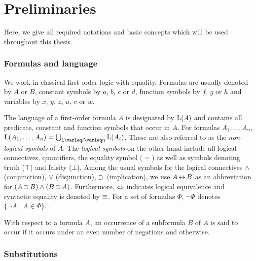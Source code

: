 \section{Preliminaries}
\label{sec:preliminaries}

Here, we give all required notations and basic concepts which will be used throughout this thesis.

\subsubsection*{Formulas and language}

We work in classical first-order logic with equality.
Formulas are usually denoted by $A$ or $B$, constant symbols by $a$, $b$, $c$ or $d$, function symbols by $f$, $g$ or $h$ and variables by $x$, $y$, $z$, $u$, $v$ or $w$.

The language of a first-order formula $A$ is designated by $\operatorname{L}(A)$ and contains all predicate, constant and function symbols that occur in $A$.
For formulas $A_1, \ldots, A_n$, $\Lang(A_1, \ldots, A_n) = \bigcup_{1\varleq i \varleq n} \Lang(A_i)$.
These are also referred to as the \emph{\mbox{non-logical} symbols} of $A$.
The \emph{logical symbols} on the other hand include all logical connectives, quantifiers, the equality symbol ($=$) as well as symbols denoting truth ($\top$) and falsity ($\bot$).
Among the usual symbols for the logical connectives $\land$ (conjunction), $\lor$ (disjunction), $\operatorname{\supset}$ (implication),
we use $A \operatorname{\leftrightarrow} B$ as an abbreviation for $(A\operatorname{\supset} B) \land (B\operatorname{\supset} A)$.
Furthermore, $\operatorname{\Leftrightarrow}$ indicates logical equivalence and syntactic equality is denoted by $\equiv$.
For a set of formulas $\Phi$, $\lnot \Phi$ denotes $\{\lnot A \mid A \in \Phi\}$.

With respect to a formula\nolinebreak{} $A$, an occurrence of a subformula $B$ of $A$ is said to occur  if it occurs under an even number of negations and  otherwise.





\subsubsection*{Substitutions}


